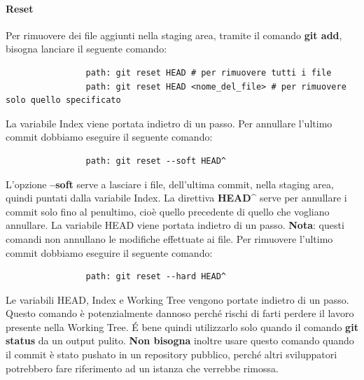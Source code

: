 			\paragraph{Reset} %
			\label{par:reset}
			Per rimuovere dei file aggiunti nella staging area, tramite il comando \textbf{git add}, bisogna lanciare il seguente comando:
				\begin{verbatim}
				path: git reset HEAD # per rimuovere tutti i file
				path: git reset HEAD <nome_del_file> # per rimuovere solo quello specificato
				\end{verbatim}
			\noindent
			La variabile Index viene portata indietro di un passo. \newline \newline
			Per annullare l'ultimo commit dobbiamo eseguire il seguente comando:
				\begin{verbatim}
				path: git reset --soft HEAD^
				\end{verbatim}
			\noindent
			L'opzione \textbf{--soft} serve a lasciare i file, dell'ultima commit, nella staging area, quindi puntati dalla variabile Index. \newline
			La direttiva \textbf{HEAD\^} serve per annullare i commit solo fino al penultimo, cioè quello precedente di quello che vogliano annullare. \newline
			La variabile HEAD viene portata indietro di un passo. \newline
			\textbf{Nota}: questi comandi non annullano le modifiche effettuate ai file. \newline \newline
			Per rimuovere l'ultimo commit dobbiamo eseguire il seguente comando:
				\begin{verbatim}
				path: git reset --hard HEAD^
				\end{verbatim}
			\noindent
			Le variabili HEAD, Index e Working Tree vengono portate indietro di un passo. \newline
			Questo comando è potenzialmente dannoso perché rischi di farti perdere il lavoro presente nella Working Tree. \'E bene quindi utilizzarlo solo quando il comando \textbf{git status} da un output pulito. \newline
			\textbf{Non bisogna} inoltre usare questo comando quando il commit è stato pushato in un repository pubblico, perché altri sviluppatori potrebbero fare riferimento ad un istanza che verrebbe rimossa.
			
		
